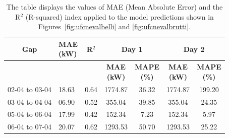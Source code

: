 \begin{table}[H]
	\begin{center}
		\begin{tabular}[c]{l|l|l|c|c|c|c}
			\multicolumn{1}{c|}{\textbf{Gap}}   &
			\makecell{\textbf{MAE}                                                                                        \\\textbf{(kW)}} &
			\multicolumn{1}{c|}{\textbf{R}$^2$} &
			\multicolumn{2}{c|}{\textbf{Day 1}} &
			\multicolumn{2}{c}{\textbf{Day 2}}                                                                            \\
			\hline

			                                    &       &      & \small \makecell{\textbf{MAE}                            \\\textbf{(kW)}} & \small \makecell{\textbf{MAPE}\\\textbf{(\%)}} & \small \makecell{\textbf{MAE}\\\textbf{(kW)}} & \small \makecell{\textbf{MAPE}\\\textbf{(\%)}}\\
			\cline{4-7}
			02-04 to 03-04                      & 18.63 & 0.64 & 1774.87                       & 36.32 & 1774.87 & 199.20 \\
			03-04 to 04-04                      & 06.90 & 0.52 & 355.04                        & 39.85 & 355.04  & 24.35  \\
			05-04 to 06-04                      & 17.99 & 0.42 & 152.34                        & 7.23  & 152.34  & 5.97   \\
			06-04 to 07-04                      & 20.07 & 0.62 & 1293.53                       & 50.70 & 1293.53 & 25.22  \\
		\end{tabular}
	\end{center}
	\caption{The table displays the values of MAE (Mean Absolute Error)\cite{metrics} and the R$^2$ (R-squared)\cite{metrics} index applied to the model predictions shown in Figures~\ref{fig:ufcnevalbelli} and \ref{fig:ufcnevalbrutti}.}\label{tab:grrundatitab1}
\end{table}

